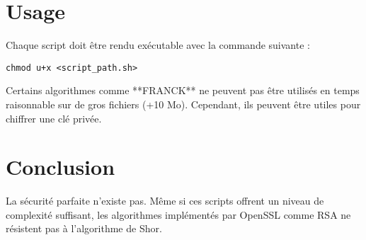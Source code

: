 \documentclass[conference]{IEEEtran}
\begin{document}
\section{Usage}
Chaque script doit être rendu exécutable avec la commande suivante :
\begin{verbatim}
chmod u+x <script_path.sh>
\end{verbatim}

Certains algorithmes comme **FRANCK** ne peuvent pas être utilisés en temps raisonnable sur de gros fichiers (+10 Mo). Cependant, ils peuvent être utiles pour chiffrer une clé privée.

\section*{Conclusion}  
La sécurité parfaite n'existe pas. Même si ces scripts offrent un niveau de complexité suffisant, les algorithmes implémentés par OpenSSL comme RSA ne résistent pas à l'algorithme de Shor.
\end{document}
